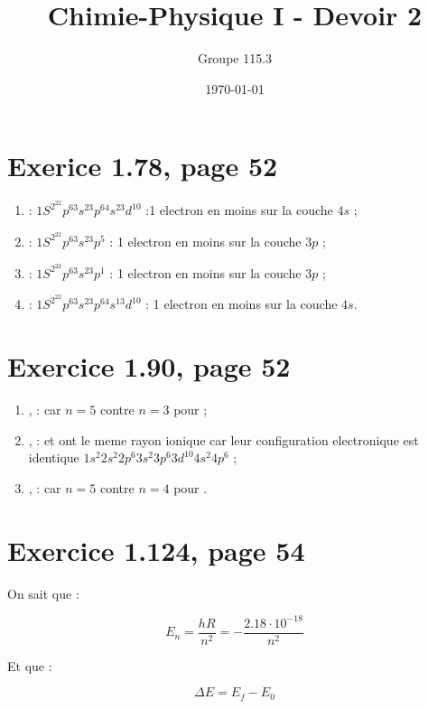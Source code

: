 \documentclass{article}
\title{Chimie-Physique I - Devoir 2}
\author{Groupe 115.3}
\date{\today}
\begin{document}
\maketitle

\section{Exerice 1.78, page 52}

\begin{enumerate}
  \item {} : $1S^2^22p^63s^23p^64s^23d^10$ :1 electron en moins sur la couche $4s$ ;
  \item {} : $1S^2^22p^63s^23p^5$ : 1 electron en moins sur la couche $3p$ ;
  \item {} : $1S^2^22p^63s^23p^1$ : 1 electron en moins sur la couche $3p$ ;
  \item {} : $1S^2^22p^63s^23p^64s^13d^10$ : 1 electron en moins sur la couche $4s$.
\end{enumerate}

\section{Exercice 1.90, page 52}

\begin{enumerate}
	\item {},  :  car $n = 5$ contre $n = 3$ pour  ;
	\item {},  :  et  ont le meme rayon 	ionique car leur configuration electronique est identique $1s^2 2s^2 2p^6 3s^2 3p^6 3d^{10}4s^2 4p^6$ ;
	\item {},  :  car $n = 5$ contre $n = 4$ pour .
\end{enumerate}

\section{Exercice 1.124, page 54}

On sait que : %

$$E_n = \frac{hR}{n^2} = -\frac{2.18 \cdot 10^{-18}}{n^2}$$

Et que : %

$$\Delta E = E_f - E_0$$
\end{document}
